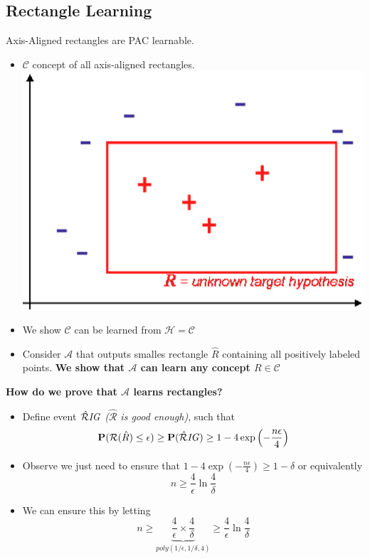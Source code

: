 \subsection{Rectangle Learning}
Axis-Aligned rectangles are PAC learnable.
\begin{itemize}
	\item $\mathcal C$ concept of all axis-aligned rectangles. \\
	\includegraphics[width = 0.6\columnwidth]{images/13-rectangle-learning}
	\item We show $\mathcal C$ can be learned from $\mathcal H = \mathcal C$
	\item Consider $\mathcal A$ that outputs smalles rectangle $\hat R$ containing all positively labeled points. \textbf{We show that $\mathcal A$ can learn any concept $R\in \mathcal C$
}\end{itemize}

\textbf{How do we prove that $\mathcal A$ learns rectangles?}\\
\begin{itemize}
	\item Define event $\hat{\mathcal R}\mathit{IG}$ \textit{($\hat{\mathcal R}$ is good enough)}, such that
	$$
		\mathbf P(\mathcal R(\hat R)\leq \epsilon) \geq \mathbf P(\hat{\mathcal R}\mathit{IG})\geq 1 - 4\exp\left(-\frac{n\epsilon}{4}\right)
	$$
	\item Observe we just need to ensure that $1 - 4\exp\left(-\frac{n\epsilon}{4}\right)\geq 1-\delta$ or equivalently
	$$
		n\geq \frac{4}{\epsilon}\ln\frac{4}{\delta}
	$$
	\item We can ensure this by letting
	$$
		n\geq \underbrace{\frac{4}{\epsilon}\times \frac{4}{\delta}}_{\mathit{poly}(1/\epsilon, 1/\delta, 4)} \geq \frac{4}{\epsilon}\ln\frac{4}{\delta}
	$$
\end{itemize}

